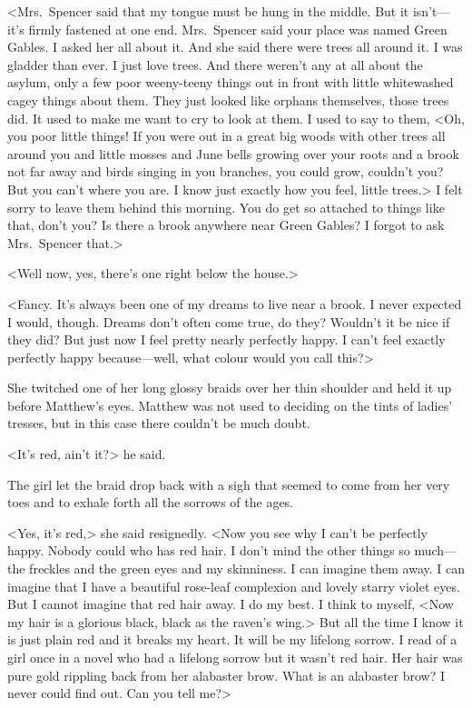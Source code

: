 <Mrs.~Spencer said that my tongue must be hung in the middle. But it isn't—it's firmly fastened at one end. Mrs.~Spencer said your place was named Green Gables. I asked her all about it. And she said there were trees all around it. I was gladder than ever. I just love trees. And there weren't any at all about the asylum, only a few poor weeny-teeny things out in front with little whitewashed cagey things about them. They just looked like orphans themselves, those trees did. It used to make me want to cry to look at them. I used to say to them, <Oh, you poor little things! If you were out in a great big woods with other trees all around you and little mosses and June bells growing over your roots and a brook not far away and birds singing in you branches, you could grow, couldn't you? But you can't where you are. I know just exactly how you feel, little trees.> I felt sorry to leave them behind this morning. You do get so attached to things like that, don't you? Is there a brook anywhere near Green Gables? I forgot to ask Mrs.~Spencer that.>

<Well now, yes, there's one right below the house.>

<Fancy. It's always been one of my dreams to live near a brook. I never expected I would, though. Dreams don't often come true, do they? Wouldn't it be nice if they did? But just now I feel pretty nearly perfectly happy. I can't feel exactly perfectly happy because—well, what colour would you call this?>

She twitched one of her long glossy braids over her thin shoulder and held it up before Matthew's eyes. Matthew was not used to deciding on the tints of ladies' tresses, but in this case there couldn't be much doubt.

<It's red, ain't it?> he said.

The girl let the braid drop back with a sigh that seemed to come from her very toes and to exhale forth all the sorrows of the ages.

<Yes, it's red,> she said resignedly. <Now you see why I can't be perfectly happy. Nobody could who has red hair. I don't mind the other things so much—the freckles and the green eyes and my skinniness. I can imagine them away. I can imagine that I have a beautiful rose-leaf complexion and lovely starry violet eyes. But I cannot imagine that red hair away. I do my best. I think to myself, <Now my hair is a glorious black, black as the raven's wing.> But all the time I know it is just plain red and it breaks my heart. It will be my lifelong sorrow. I read of a girl once in a novel who had a lifelong sorrow but it wasn't red hair. Her hair was pure gold rippling back from her alabaster brow. What is an alabaster brow? I never could find out. Can you tell me?>

